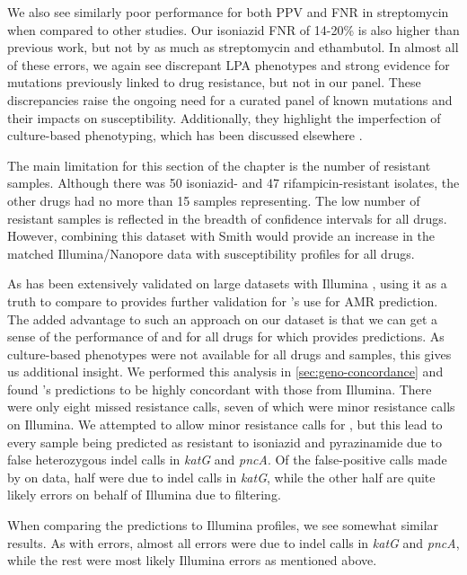 We also see similarly poor performance for both PPV and FNR in streptomycin when compared to other studies. Our isoniazid FNR of 14-20\% is also higher than previous work, but not by as much as streptomycin and ethambutol. In almost all of these errors, we again see discrepant LPA phenotypes and strong evidence for mutations previously linked to drug resistance, but not in our panel. These discrepancies raise the ongoing need for a curated panel of known mutations and their impacts on susceptibility. Additionally, they highlight the imperfection of culture-based phenotyping, which has been discussed elsewhere \cite{walker2015, who2018technical,cryptic2018}.

The main limitation for this section of the chapter is the number of resistant samples. Although there was 50 isoniazid- and 47 rifampicin-resistant isolates, the other drugs had no more than 15 samples representing. The low number of resistant samples is reflected in the breadth of confidence intervals for all drugs. However, combining this dataset with Smith \etal{} \cite{smith2020} would provide an increase in the matched Illumina/Nanopore data with susceptibility profiles for all drugs.

\noindent
As \mykrobe{} has been extensively validated on large datasets with Illumina \cite{bradley2015,hunt2019}, using it as a truth to compare \ont{} to provides further validation for \ont{}'s use for AMR prediction. The added advantage to such an approach on our dataset is that we can get a sense of the performance of \drprg{} and \mykrobe{} \ont{} for all drugs for which \mykrobe{} provides predictions. As culture-based phenotypes were not available for all drugs and samples, this gives us additional insight. We performed this analysis in \autoref{sec:geno-concordance} and found \mykrobe{}'s \ont{} predictions to be highly concordant with those from Illumina. There were only eight missed resistance calls, seven of which were minor resistance calls on Illumina. We attempted to allow minor resistance calls for \ont{}, but this lead to every sample being predicted as resistant to isoniazid and pyrazinamide due to false heterozygous indel calls in \textit{katG} and \textit{pncA}. Of the false-positive calls made by \mykrobe{} on \ont{} data, half were due to indel calls in \textit{katG}, while the other half are quite likely errors on behalf of Illumina due to filtering.

When comparing the \drprg{} predictions to \mykrobe{} Illumina profiles, we see somewhat similar results. As with \mykrobe{} \ont{} errors, almost all \drprg{} errors were due to indel calls in \textit{katG} and \textit{pncA}, while the rest were most likely Illumina errors as mentioned above. 

